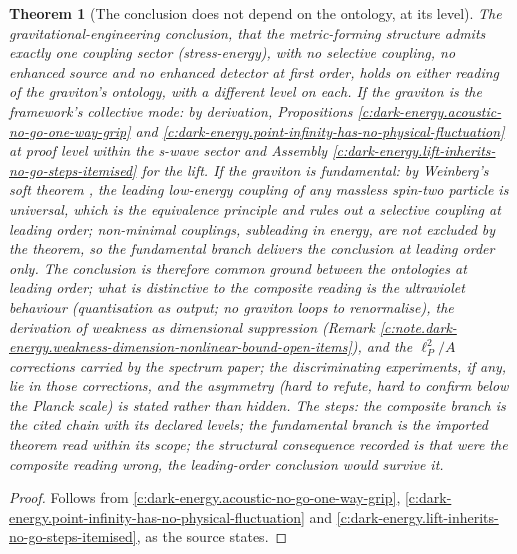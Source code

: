 \documentclass[11pt]{article}
\newtheorem{theorem}{Theorem}[section]
\theoremstyle{definition}
\theoremstyle{plain}
\begin{document}
\begin{theorem}[The conclusion does not depend on the ontology, at its level]\label{c:dark-energy.conclusion-does-not-depend-ontology-level}
The gravitational-engineering conclusion, that the metric-forming structure admits exactly one coupling sector (stress-energy), with no selective coupling, no enhanced source and no enhanced detector at first order, holds on either reading of the graviton's ontology, with a different level on each. If the graviton is the framework's collective mode: by derivation, Propositions \ref{c:dark-energy.acoustic-no-go-one-way-grip} and \ref{c:dark-energy.point-infinity-has-no-physical-fluctuation} at proof level within the s-wave sector and Assembly \ref{c:dark-energy.lift-inherits-no-go-steps-itemised} for the lift. If the graviton is fundamental: by Weinberg's soft theorem \cite{Weinberg1964}, the leading low-energy coupling of any massless spin-two particle is universal, which is the equivalence principle and rules out a selective coupling at leading order; non-minimal couplings, subleading in energy, are not excluded by the theorem, so the fundamental branch delivers the conclusion at leading order only. The conclusion is therefore common ground between the ontologies at leading order; what is distinctive to the composite reading is the ultraviolet behaviour (quantisation as output; no graviton loops to renormalise), the derivation of weakness as dimensional suppression (Remark \ref{c:note.dark-energy.weakness-dimension-nonlinear-bound-open-items}), and the $\ell_P^2/A$ corrections carried by the spectrum paper; the discriminating experiments, if any, lie in those corrections, and the asymmetry (hard to refute, hard to confirm below the Planck scale) is stated rather than hidden. The steps: the composite branch is the cited chain with its declared levels; the fundamental branch is the imported theorem read within its scope; the structural consequence recorded is that were the composite reading wrong, the leading-order conclusion would survive it.
\end{theorem}
\begin{proof}
Follows from \ref{c:dark-energy.acoustic-no-go-one-way-grip}, \ref{c:dark-energy.point-infinity-has-no-physical-fluctuation} and \ref{c:dark-energy.lift-inherits-no-go-steps-itemised}, as the source states.

\end{proof}
\end{document}
